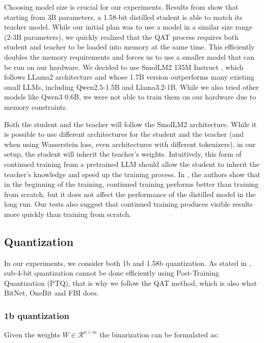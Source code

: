 \documentclass{article}
\begin{document}
Choosing model size is crucial for our experiments. Results from \cite{ma2024era1bitllmslarge} show that starting from 3B parameters, a 1.58-bit distilled student is able to match its teacher model. While our initial plan was to use a model in a similar size range (2-3B parameters), we quickly realized that the QAT process requires both student and teacher to be loaded into memory at the same time. This efficiently doubles the memory requirements and forces us to use a smaller model that can be run on our hardware. We decided to use SmolLM2 135M Instruct \cite{allal2025smollm2smolgoesbig}, which follows LLama2 architecture and whose 1.7B version outperforms many existing small LLMs, including Qwen2.5-1.5B and Llama3.2-1B. While we also tried other models like Qwen3 0.6B, we were not able to train them on our hardware due to memory constraints.

Both the student and the teacher will follow the SmolLM2 architecture. While it is possible to use different architectures for the student and the teacher (and when using Wasserstein loss, even architectures with different tokenizers), in our setup, the student will inherit the teacher's weights. Intuitively, this form of continued training from a pretrained LLM should allow the student to inherit the teacher's knowledge and speed up the training process. In \cite{fbillm}, the authors show that in the beginning of the training, continued training performs better than training from scratch, but it does not affect the performance of the distilled model in the long run. Our tests also suggest that continued training produces visible results more quickly than training from scratch.

\subsection{Quantization}

In our experiments, we consider both 1b and 1.58b quantization. As stated in \cite{du2024bitdistillerunleashingpotentialsub4bit}, sub-4-bit quantization cannot be done efficiently using Post-Training Quantization (PTQ), that is why we follow the QAT method, which is also what BitNet, OneBit \cite{onebit} and FBI does.

\subsubsection{1b quantization}

Given the weights \(W \in \mathcal{R}^{n \times m}\) the binarization can be formulated as:
\end{document}
